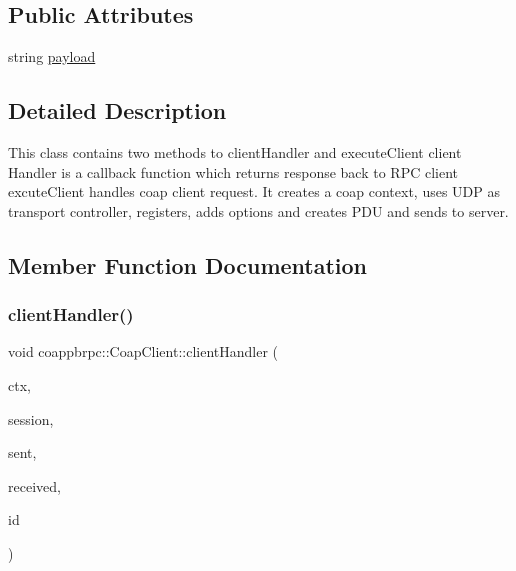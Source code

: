 \subsection*{Public Attributes}
\begin{DoxyCompactItemize}
\item 
string \hyperlink{classcoappbrpc_1_1CoapClient_ae6909f236ca1cd6b8b6343b7827ea004}{payload}
\end{DoxyCompactItemize}


\subsection{Detailed Description}
This class contains two methods to client\+Handler and execute\+Client client Handler is a callback function which returns response back to R\+PC client excute\+Client handles coap client request. It creates a coap context, uses U\+DP as transport controller, registers, adds options and creates P\+DU and sends to server. 

\subsection{Member Function Documentation}
\mbox{\label{classcoappbrpc_1_1CoapClient_ab27b2485df1e7213425fe0f1b75110fa}} 
\subsubsection{\texorpdfstring{client\+Handler()}{clientHandler()}}
{\footnotesize\ttfamily void coappbrpc\+::\+Coap\+Client\+::client\+Handler (\begin{DoxyParamCaption}\item[{struct coap\+\_\+context\+\_\+t $\ast$}]{ctx,  }\item[{coap\+\_\+session\+\_\+t $\ast$}]{session,  }\item[{coap\+\_\+pdu\+\_\+t $\ast$}]{sent,  }\item[{coap\+\_\+pdu\+\_\+t $\ast$}]{received,  }\item[{const coap\+\_\+tid\+\_\+t}]{id }\end{DoxyParamCaption})\hspace{0.3cm}{\ttfamily [static]}}



